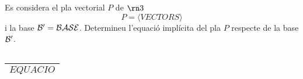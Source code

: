 \begin{enunciat}
Es considera el pla vectorial $P$ de $\rn 3$
\[
  P = \langle VECTORS \rangle
\]
i la base $\cal B'=BASE$. Determineu l'equació implícita del pla $P$ respecte de la base $\cal B'$.
\end{enunciat}

\begin{quadricula}
\begin{tabular}{|C{5cm}{0.5cm}|}
\hline
 \\
\hline
\end{tabular}
\end{quadricula}

\begin{solucio}
\begin{center}
\begin{tabular}{|C{5cm}{0.5cm}|}
\hline
$EQUACIO$ \\
\hline
\end{tabular}
\end{center}
\end{solucio}
